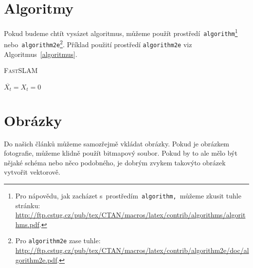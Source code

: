 \documentclass[a4paper, 11pt]{article}
\begin{document}
\bigskip
\pagebreak

\section{Algoritmy}\label{sekcia3Algoritmy}
Pokud budeme chtít vysázet algoritmus, můžeme použít prostředí\verb| algorithm|\footnote{Pro nápovědu, jak zacházet s~prostředím\texttt{ algorithm, }můžeme zkusit tuhle stránku:\\ \href{http://ftp.cstug.cz/pub/tex/CTAN/macros/latex/contrib/algorithms/algorithms.pdf}{http://ftp.cstug.cz/pub/tex/CTAN/macros/latex/contrib/algorithms/algorithms.pdf}.}  
nebo\verb| algorithm2e|\footnote{Pro \texttt{algorithm2e} zase tuhle: \href{http://ftp.cstug.cz/pub/tex/CTAN/macros/latex/contrib/algorithm2e/doc/algorithm2e.pdf}{http://ftp.cstug.cz/pub/tex/CTAN/macros/latex/contrib/algorithm2e/doc/algorithm2e.pdf}.}. Příklad použití prostředí \verb|algorithm2e| viz Algoritmus~\ref{algoritmus}.

\begin{algorithm}\label{algoritmus}
    \caption{\textsc{FastSLAM}}
    \SetNlSty{}{}{:}
    \BlankLine
    \SetNlSkip{-0.4cm}
    \Indp \Indp
    $\overline{X_{t}}=X_{t}=0$\\
\end{algorithm}

\section{Obrázky}
Do našich článků můžeme samozřejmě vkládat obrázky. Pokud je obrázkem fotografie, můžeme klidně použít bitmapový soubor. Pokud by to ale mělo být nějaké schéma nebo něco podobného, je dobrým zvykem takovýto obrázek vytvořit vektorově.
\end{document}
